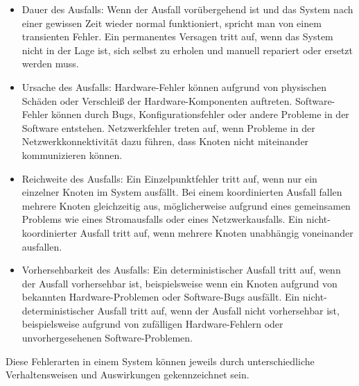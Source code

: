 \documentclass[../vs-script-first-v01.tex]{subfiles}
\begin{document}
\begin{itemize}
\item Dauer des Ausfalls: Wenn der Ausfall vorübergehend ist und das System nach einer gewissen Zeit wieder normal funktioniert, spricht man von einem transienten Fehler. Ein permanentes Versagen tritt auf, wenn das System nicht in der Lage ist, sich selbst zu erholen und manuell repariert oder ersetzt werden muss.
\item Ursache des Ausfalls: Hardware-Fehler können aufgrund von physischen Schäden oder Verschleiß der Hardware-Komponenten auftreten. Software-Fehler können durch Bugs, Konfigurationsfehler oder andere Probleme in der Software entstehen. Netzwerkfehler treten auf, wenn Probleme in der Netzwerkkonnektivität dazu führen, dass Knoten nicht miteinander kommunizieren können.
\item Reichweite des Ausfalls: Ein Einzelpunktfehler tritt auf, wenn nur ein einzelner Knoten im System ausfällt. Bei einem koordinierten Ausfall fallen mehrere Knoten gleichzeitig aus, möglicherweise aufgrund eines gemeinsamen Problems wie eines Stromausfalls oder eines Netzwerkausfalls. Ein nicht-koordinierter Ausfall tritt auf, wenn mehrere Knoten unabhängig voneinander ausfallen.
\item Vorhersehbarkeit des Ausfalls: Ein deterministischer Ausfall tritt auf, wenn der Ausfall vorhersehbar ist, beispielsweise wenn ein Knoten aufgrund von bekannten Hardware-Problemen oder Software-Bugs ausfällt. Ein nicht-deterministischer Ausfall tritt auf, wenn der Ausfall nicht vorhersehbar ist, beispielsweise aufgrund von zufälligen Hardware-Fehlern oder unvorhergesehenen Software-Problemen.
\end{itemize} 
Diese Fehlerarten in einem System können jeweils durch unterschiedliche Verhaltensweisen und Auswirkungen gekennzeichnet sein.
\end{document}
